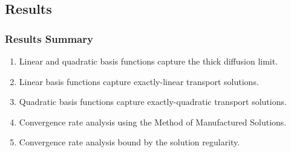 \documentclass[compress,10pt]{beamer}
\begin{document}
\subsection{Results}
\begin{frame}[t]\frametitle{Results Summary}
\begin{block}{}
\begin{enumerate}
\item Linear and quadratic basis functions capture the thick diffusion limit.
\item Linear basis functions capture exactly-linear transport solutions.
\item Quadratic basis functions capture exactly-quadratic transport solutions.
\item Convergence rate analysis using the Method of Manufactured Solutions. 
\item Convergence rate analysis bound by the solution regularity.
\end{enumerate}
\end{block}
\end{frame}
\end{document}
